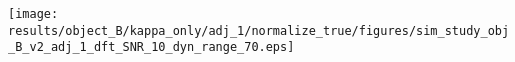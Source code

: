 \texttt{[image: results/object\_B/kappa\_only/adj\_1/normalize\_true/figures/sim\_study\_obj\_B\_v2\_adj\_1\_dft\_SNR\_10\_dyn\_range\_70.eps]}
